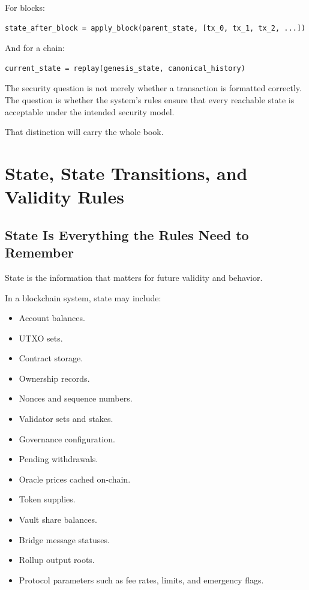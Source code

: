 For blocks:

\begin{lstlisting}
state_after_block = apply_block(parent_state, [tx_0, tx_1, tx_2, ...])
\end{lstlisting}

And for a chain:

\begin{lstlisting}
current_state = replay(genesis_state, canonical_history)
\end{lstlisting}

The security question is not merely whether a transaction is formatted
correctly. The question is whether the system's rules ensure that every
reachable state is acceptable under the intended security model.

That distinction will carry the whole book.

\section{State, State Transitions, and Validity Rules}

\subsection{State Is Everything the Rules Need to Remember}

State is the information that matters for future validity and behavior.

In a blockchain system, state may include:

\begin{itemize}
\tightlist
\item
  Account balances.
\item
  UTXO sets.
\item
  Contract storage.
\item
  Ownership records.
\item
  Nonces and sequence numbers.
\item
  Validator sets and stakes.
\item
  Governance configuration.
\item
  Pending withdrawals.
\item
  Oracle prices cached on-chain.
\item
  Token supplies.
\item
  Vault share balances.
\item
  Bridge message statuses.
\item
  Rollup output roots.
\item
  Protocol parameters such as fee rates, limits, and emergency flags.
\end{itemize}

